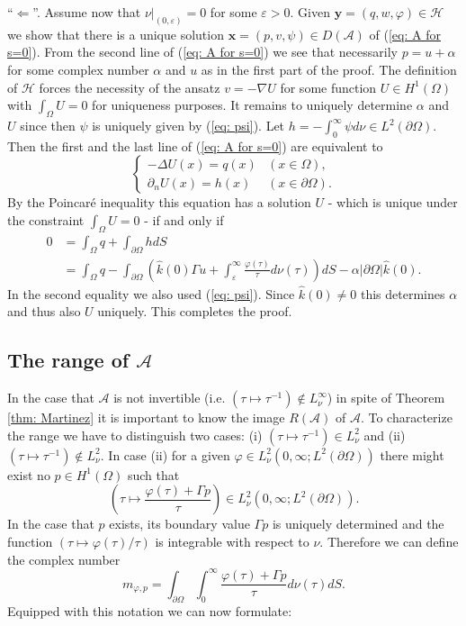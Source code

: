 \documentclass{amsart}
\newcommand{\abs}[1]{\left|#1\right|}
\newcommand{\A}{\mathcal{A}}
\newcommand{\xnice}{\mathbf{x}}
\newcommand{\ynice}{\mathbf{y}}
\newcommand{\Ho}{\mathcal{H}}
\newcommand{\khat}{\hat{k}}
\begin{document}
``$\Leftarrow$''. Assume now that $\nu|_{(0,\varepsilon)}=0$ for some $\varepsilon>0$. Given $\ynice=(q,w,\varphi)\in\Ho$ we show that there is a unique solution $\xnice=(p,v,\psi)\in D(\A)$ of (\ref{eq: A for s=0}). From the second line of (\ref{eq: A for s=0}) we see that necessarily $p=u+\alpha$ for some complex number $\alpha$ and $u$ as in the first part of the proof. The definition of $\Ho$ forces the necessity of the ansatz $v=-\nabla U$ for some function $U\in H^1(\Omega)$ with $\int_{\Omega} U=0$ for uniqueness purposes. It remains to uniquely determine $\alpha$ and $U$ since then $\psi$ is uniquely given by (\ref{eq: psi}). Let $h=-\int_0^{\infty} \psi d\nu\in L^2(\partial\Omega)$. Then the first and the last line of (\ref{eq: A for s=0}) are equivalent to
\begin{equation}\nonumber
 \begin{cases}
  -\Delta U(x) = q(x) &  (x\in\Omega), \\
  \partial_n U(x) = h(x) & (x\in\partial\Omega).
 \end{cases}
\end{equation}
By the Poincar\'e inequality this equation has a solution $U$ - which is unique under the constraint $\int_{\Omega} U=0$ - if and only if
\begin{align}\nonumber
 0 &= \int_{\Omega} q + \int_{\partial\Omega} h dS \\ \label{eq: condition on alpha}
 &= \int_{\Omega} q - \int_{\partial\Omega}\left( \khat(0) \Gamma u + \int_{\varepsilon}^{\infty} \frac{\varphi(\tau)}{\tau} d\nu(\tau)\right)dS -\alpha\abs{\partial\Omega}\khat(0). 
\end{align}
In the second equality we also used (\ref{eq: psi}). Since $\khat(0)\neq0$ this determines $\alpha$ and thus also $U$ uniquely. This completes the proof.

\subsection{The range of $\A$}\label{sec: range of A}
In the case that $\A$ is not invertible (i.e. $(\tau\mapsto\tau^{-1})\notin L^{\infty}_{\nu}$) in spite of Theorem \ref{thm: Martinez} it is important to know the image $R(\A)$ of $\A$. To characterize the range we have to distinguish two cases: (i) $(\tau\mapsto\tau^{-1})\in L^{2}_{\nu}$ and (ii) $(\tau\mapsto\tau^{-1})\notin L^{2}_{\nu}$. In case (ii) for a given $\varphi\in L^2_{\nu}(0,\infty;L^2(\partial\Omega))$ there might exist no $p\in H^1(\Omega)$ such that
\begin{equation}\nonumber
 \left( \tau \mapsto \frac{\varphi(\tau)+\Gamma p}{\tau} \right) \in L^2_{\nu}(0,\infty; L^2(\partial\Omega)) .
\end{equation}
In the case that $p$ exists, its boundary value $\Gamma p$ is uniquely determined and the function $(\tau\mapsto\varphi(\tau)/\tau)$ is integrable with respect to $\nu$. Therefore we can define the complex number
\begin{equation}\label{eq: mphi}
 m_{\varphi,p} = \int_{\partial\Omega} \int_0^{\infty} \frac{\varphi(\tau)+\Gamma p}{\tau} d\nu(\tau) dS .
\end{equation}
Equipped with this notation we can now formulate:
\end{document}
